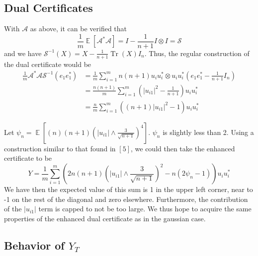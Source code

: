 \documentclass[11pt]{article}
\newcommand{\<}{\langle}
\renewcommand{\>}{\rangle}
\newcommand{\E}{\operatorname{\mathbb{E}}}
\newcommand{\cA}{\mathcal{A}}
\newcommand{\tr}{\operatorname{Tr}}
\numberwithin{equation}{section}
\newcommand{\cS}{\mathcal{S}}
\begin{document}
\subsection{Dual Certificates}

With $\cA$ as above, it can be verified that
\[
\frac{1}{m}\E \left[ \cA^* \cA \right] = I - \frac{1}{n+1} I \otimes I = \cS
\]
and we have $\cS^{-1}(X) = X - \frac{1}{n+1}\tr(X)I_n$. Thus, the regular construction of the dual certificate would be\\
\begin{align*}
\frac{1}{m}\cA^* \cA \cS^{-1} (e_1 e_1^*) &= \frac{1}{m} \sum_{i=1}^{m}n(n+1) u_i u_i^* \otimes u_i u_i^* (e_1 e_1^* - \frac{1}{n+1}I_n)\\
&= \frac{n(n+1)}{m}\sum_{i=1}^{m} (|u_{i1}|^2 - \frac{1}{n+1})u_i u_i^*\\
&= \frac{n}{m} \sum_{i=1}^{m} ((n+1)|u_{i1}|^2 -1)u_i u_i^*
\end{align*}

Let $\psi_n = \E\left[ (n)(n+1) ( |u_{i1}|\wedge\frac{3}{\sqrt{n+1}} ) ^4 \right]$. $\psi_n$ is slightly less than 2. Using a construction similar to that found in $\left[5\right]$, we could then take the enhanced certificate to be
\[
Y =  \frac{1}{m} \sum_{i=1}^{m} (2n(n+1)(|u_{i1}|\wedge\frac{3}{\sqrt{n+1}} )^2  - n(2\psi_n -1))u_i u_i^*
\]
We have then the expected value of this sum is 1 in the upper left corner, near to -1 on the rest of the diagonal and zero elsewhere. Furthermore, the contribution of the $|u_{i1}|$ term is capped to not be too large. We thus hope to acquire the same properties of the enhanced dual certificate as in the gaussian case. 

\subsection{Behavior of $Y_T$}
\end{document}
